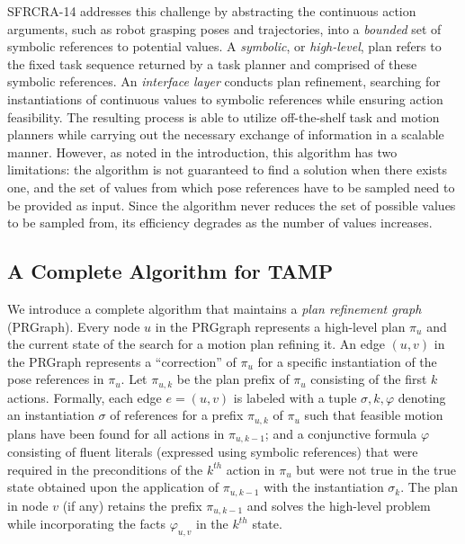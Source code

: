 SFRCRA-14 addresses this challenge by abstracting the continuous
action arguments, such as robot grasping poses and trajectories, into
a \emph{bounded} set of symbolic references to potential values. A
\emph{symbolic}, or \emph{high-level}, plan refers to the fixed task
sequence returned by a task planner and comprised of these symbolic
references. An \emph{interface layer} conducts plan refinement,
searching for instantiations of continuous values to symbolic
references while ensuring action feasibility.  The resulting process
is able to utilize off-the-shelf task and motion planners while
carrying out the necessary exchange of information in a scalable
manner. However, as noted in the introduction, this algorithm has two
limitations: the algorithm is not guaranteed to find a solution when
there exists one, and the set of values from which pose references
have to be sampled need to be provided as input. Since the algorithm
never reduces the set of possible values to be sampled from, its
efficiency degrades as the number of values increases.

\subsection{A Complete Algorithm for TAMP}
We introduce a complete algorithm that maintains a \emph{plan
  refinement graph} (PRGraph). Every node $u$ in the PRGgraph
represents a high-level plan $\pi_u$ and the current state of the search
for a motion plan refining it. An edge $(u,v)$ in the PRGraph
represents a ``correction'' of $\pi_u$ for a specific instantiation of
the pose references in $\pi_u$. Let $\pi_{u,k}$ be the plan prefix of
$\pi_u$ consisting of the first $k$ actions. Formally, each edge
$e=(u,v)$ is labeled with a tuple $ \sigma, k, \varphi$ denoting an
instantiation $\sigma$ of references for a prefix $\pi_{u,k}$ of
$\pi_u$ such that feasible motion plans have been found for all
actions in $\pi_{u,k-1}$; and a conjunctive formula $\varphi$
consisting of fluent literals (expressed using symbolic references)
that were required in the preconditions of the $k^{th}$ action in
$\pi_u$ but were not true in the true state obtained upon the
application of $\pi_{u,k-1}$ with the instantiation $\sigma_k$.  The
plan in node $v$ (if any) retains the prefix $\pi_{u,k-1}$ and solves
the high-level problem while incorporating the facts $\varphi_{u,v}$
in the $k^{th}$ state.

